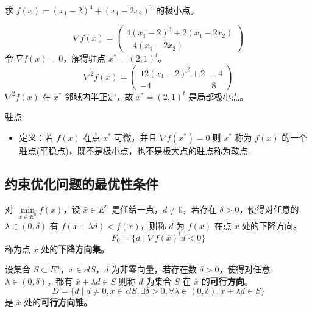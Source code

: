 \begin{example}
    求 $f(x) = (x_1 - 2)^4 + (x_1 - 2x_2)^2$ 的极小点。

    \answer
    \[
        \nabla f(x) = \begin{pmatrix}
            4(x_1 - 2)^3 + 2(x_1 - 2x_2)\\
            -4(x_1 - 2x_2)
        \end{pmatrix}    
    \]
    令 $\nabla f(x) = 0$，解得驻点 $x^* = (2, 1)^t$。
    \[
        \nabla^2 f(x) = \begin{pmatrix}
            12(x_1 - 2)^2 + 2 & -4\\
            -4 & 8
        \end{pmatrix}    
    \]
    $\nabla^2 f(x)$ 在 $x^*$ 邻域内半正定，故 $x^* = (2, 1)^t$ 是局部极小点。
\end{example}

\begin{note}
    驻点\begin{itemize}
        \item 定义：若 $f(x)$ 在点 $x^*$ 可微，并且 $\nabla f(x^*) = 0$.则 $x^*$ 称为 $f(x)$ 的一个驻点(平稳点)，既不是极小点，也不是极大点的驻点称为鞍点.
    \end{itemize}
\end{note}

\subsection{约束优化问题的最优性条件}
\begin{definition}[下降方向]
    对 $\underset{x \in E^n}{\min}f(x)$，设 $\bar{x} \in E^n$ 是任给一点，$d\neq 0$，若存在 $\delta > 0$，使得对任意的 $\lambda \in (0, \delta)$ 有 $f(\bar{x} + \lambda d) < f(\bar{x})$，则称 $d$ 为 $f(x)$ 在点 $\bar{x}$ 处的下降方向。
    \[
        F_0 = \{d \mid \nabla f(\bar{x})^td < 0\}
    \]
    称为点 $\bar{x}$ 处的\textbf{下降方向集}。
\end{definition}

\begin{definition}[可行方向]
    设集合 $S \subset E^n$，$\bar{x} \in clS$，$d$ 为非零向量，若存在数 $\delta > 0$，使得对任意 $\lambda \in (0, \delta)$，都有 $\bar{x} + \lambda d \in S$ 则称 $d$ 为集合 $S$ 在 $\bar{x}$ 的\textbf{可行方向}。
    \[
        D = \{d \mid d \neq 0, \bar{x} \in clS, \exists \delta>0, \forall \lambda \in(0, \delta), \bar{x}+\lambda d \in S\}
    \] 
    是 $\bar{x}$ 处的\textbf{可行方向锥}。
\end{definition}

